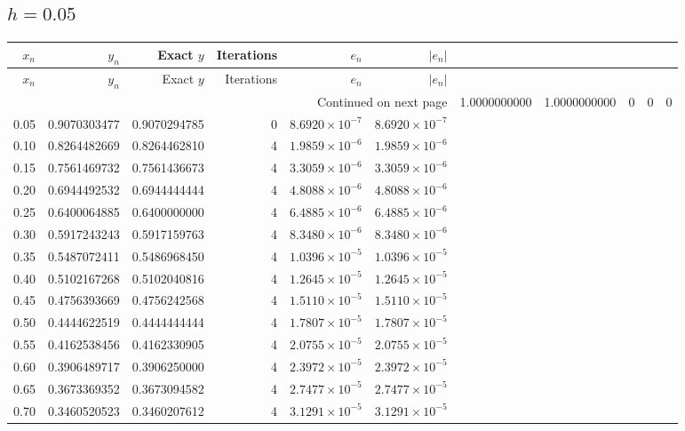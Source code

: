 \documentclass[11pt,a4paper]{article}
\begin{document}
\subsection{\texorpdfstring{$h=0.05$}{h=0.05}}
\begingroup\footnotesize\setlength{\tabcolsep}{5pt}
\begin{longtable}{rrrrrr}
\toprule $x_n$ & $y_n$ & Exact $y$ & Iterations & $e_n$ & $|e_n|$ \\ \midrule
\endfirsthead
\toprule $x_n$ & $y_n$ & Exact $y$ & Iterations & $e_n$ & $|e_n|$ \\ \midrule
\endhead\midrule\multicolumn{6}{r}{Continued on next page}\endfoot\bottomrule\endlastfoot
0.00 & 1.0000000000 & 1.0000000000 & 0 & $0$ & $0$ \\
0.05 & 0.9070303477 & 0.9070294785 & 0 & $8.6920\times 10^{-7}$ & $8.6920\times 10^{-7}$ \\
0.10 & 0.8264482669 & 0.8264462810 & 4 & $1.9859\times 10^{-6}$ & $1.9859\times 10^{-6}$ \\
0.15 & 0.7561469732 & 0.7561436673 & 4 & $3.3059\times 10^{-6}$ & $3.3059\times 10^{-6}$ \\
0.20 & 0.6944492532 & 0.6944444444 & 4 & $4.8088\times 10^{-6}$ & $4.8088\times 10^{-6}$ \\
0.25 & 0.6400064885 & 0.6400000000 & 4 & $6.4885\times 10^{-6}$ & $6.4885\times 10^{-6}$ \\
0.30 & 0.5917243243 & 0.5917159763 & 4 & $8.3480\times 10^{-6}$ & $8.3480\times 10^{-6}$ \\
0.35 & 0.5487072411 & 0.5486968450 & 4 & $1.0396\times 10^{-5}$ & $1.0396\times 10^{-5}$ \\
0.40 & 0.5102167268 & 0.5102040816 & 4 & $1.2645\times 10^{-5}$ & $1.2645\times 10^{-5}$ \\
0.45 & 0.4756393669 & 0.4756242568 & 4 & $1.5110\times 10^{-5}$ & $1.5110\times 10^{-5}$ \\
0.50 & 0.4444622519 & 0.4444444444 & 4 & $1.7807\times 10^{-5}$ & $1.7807\times 10^{-5}$ \\
0.55 & 0.4162538456 & 0.4162330905 & 4 & $2.0755\times 10^{-5}$ & $2.0755\times 10^{-5}$ \\
0.60 & 0.3906489717 & 0.3906250000 & 4 & $2.3972\times 10^{-5}$ & $2.3972\times 10^{-5}$ \\
0.65 & 0.3673369352 & 0.3673094582 & 4 & $2.7477\times 10^{-5}$ & $2.7477\times 10^{-5}$ \\
0.70 & 0.3460520523 & 0.3460207612 & 4 & $3.1291\times 10^{-5}$ & $3.1291\times 10^{-5}$ \\

\end{longtable}
\end{document}
